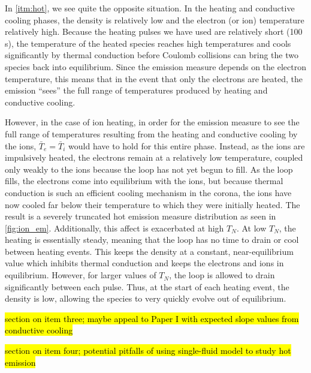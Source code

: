 \documentclass[tighten,apj]{emulateapj}
\begin{document}
	\par In \autoref{itm:hot}, we see quite the opposite situation. In the heating and conductive cooling phases, the density is relatively low and the electron (or ion) temperature relatively high. Because the heating pulses we have used are relatively short (100 s), the temperature of the heated species reaches high temperatures and cools significantly by thermal conduction before Coulomb collisions can bring the two species back into equilibrium. Since the emission measure depends on the electron temperature, this means that in the event that only the electrons are heated, the emission  ``sees'' the full range of temperatures produced by heating and conductive cooling. 
	\par However, in the case of ion heating, in order for the emission measure to see the full range of temperatures resulting from the heating and conductive cooling by the ions, $\bar{T}_e=\bar{T}_i$ would have to hold for this entire phase. Instead, as the ions are impulsively heated, the electrons remain at a relatively low temperature, coupled only weakly to the ions because the loop has not yet begun to fill. As the loop fills, the electrons come into equilibrium with the ions, but because thermal conduction is such an efficient cooling mechanism in the corona, the ions have now cooled far below their temperature to which they were initially heated. The result is a severely truncated hot emission measure distribution as seen in \autoref{fig:ion_em}. Additionally, this affect is exacerbated at high $T_N$. At low $T_N$, the heating is essentially steady, meaning that the loop has no time to drain or cool between heating events. This keeps the density at a constant, near-equilibrium value which inhibits thermal conduction and keeps the electrons and ions in equilibrium. However, for larger values of $T_N$, the loop is allowed to drain significantly between each pulse. Thus, at the start of each heating event, the density is low, allowing the species to very quickly evolve out of equilibrium. 
	\par\hl{section on item three; maybe appeal to Paper I with expected slope values from conductive cooling}
	\par\hl{section on item four; potential pitfalls of using single-fluid model to study hot emission}
\end{document}
